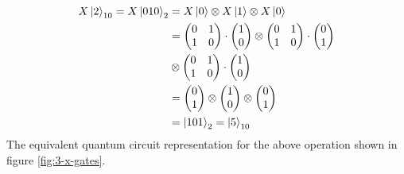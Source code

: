 \begin{align}\label{eqn:3x-gates}
	X\ket{2}_{10} = X\ket{010}_{2}	& = X\ket{0}\otimes X\ket{1} \otimes X\ket{0}\nonumber\\
				& = \left(\begin{matrix}
					0 & 1\\
					1 & 0
				\end{matrix}\right) \cdot \left( \begin{matrix}
				1\\ 0
			\end{matrix}\right) \otimes \left(\begin{matrix}
			0 & 1\\
			1 & 0
		\end{matrix}\right) \cdot \left( \begin{matrix}
		0\\ 1
	\end{matrix}\right) \nonumber\\ & \otimes \left(\begin{matrix}
	0 & 1\\
	1 & 0
\end{matrix}\right) \cdot \left( \begin{matrix}
1\\ 0
\end{matrix}\right)\nonumber\\
& = \left(\begin{matrix}
	0 \\ 1
\end{matrix}\right)\otimes\left(\begin{matrix}
1 \\ 0
\end{matrix}\right)\otimes\left(\begin{matrix}
0 \\ 1
\end{matrix}\right)\nonumber\\
& = \ket{101}_{2} = \ket{5}_{10}
\end{align}
The equivalent quantum circuit representation for the above operation shown in figure \ref{fig:3-x-gates}. 
